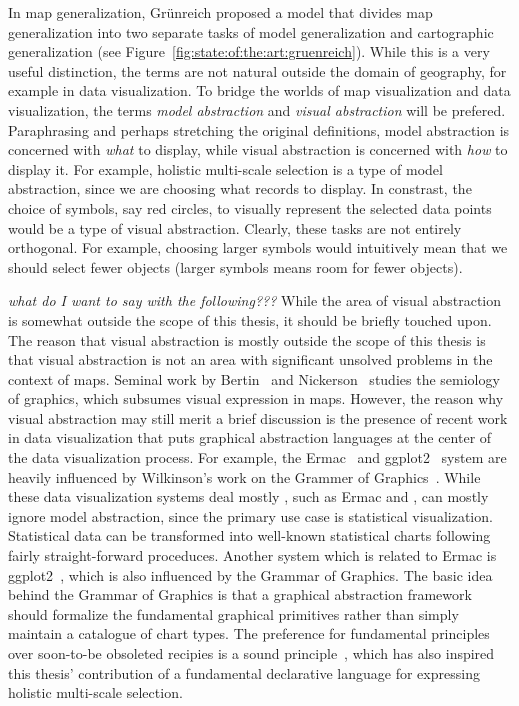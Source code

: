 \documentclass[11pt, oneside]{report}
\begin{document}
In map generalization, Gr{\"u}nreich proposed a model that divides map generalization into two separate tasks of model generalization and cartographic generalization (see Figure~\ref{fig:state:of:the:art:gruenreich}). While this is a very useful distinction, the terms are not natural outside the domain of geography, for example in data visualization. To bridge the worlds of map visualization and data visualization, the terms \emph{model abstraction} and \emph{visual abstraction} will be prefered. Paraphrasing and perhaps stretching the original definitions, model abstraction is concerned with \emph{what} to display, while visual abstraction is concerned with \emph{how} to display it. For example, holistic multi-scale selection is a type of model abstraction, since we are choosing what records to display. In constrast, the choice of symbols, say red circles, to visually represent the selected data points would be a type of visual abstraction. Clearly, these tasks are not entirely orthogonal. For example,  choosing larger symbols would intuitively mean that we should select fewer objects (larger symbols means room for fewer objects).

\emph{what do I want to say with the following???}
While the area of visual abstraction is somewhat outside the scope of this thesis, it should be briefly touched upon. The reason that visual abstraction is mostly outside the scope of this thesis is that visual abstraction is not an area with significant unsolved problems in the context of maps. Seminal work by Bertin~\cite{jacques1967semiologie} and Nickerson~\cite{nickerson1994visual} studies the semiology of graphics, which subsumes visual expression in maps. However, the reason why visual abstraction may still merit a brief discussion is the presence of recent work in data visualization that puts graphical abstraction languages at the center of the data visualization process. For example, the Ermac~\cite{wu2014case} and ggplot2~\cite{wickham2009ggplot2} system are heavily influenced by Wilkinson's work on the Grammer of Graphics~\cite{wilkinson2006grammar}. While these data visualization systems deal mostly , such as Ermac and , can mostly ignore model abstraction, since the primary use case is statistical visualization. Statistical data can be transformed into well-known statistical charts following fairly straight-forward proceduces. Another system which is related to Ermac is ggplot2~\cite{wickham2009ggplot2}, which is also influenced by the Grammar of Graphics. The basic idea behind the Grammar of Graphics is that a graphical abstraction framework should formalize the fundamental graphical primitives rather than simply maintain a catalogue of chart types. The preference for fundamental principles over soon-to-be obsoleted recipies is a sound principle~\cite{koch2013abstraction}, which has also inspired this thesis' contribution of a fundamental declarative language for expressing holistic multi-scale selection.
\end{document}
